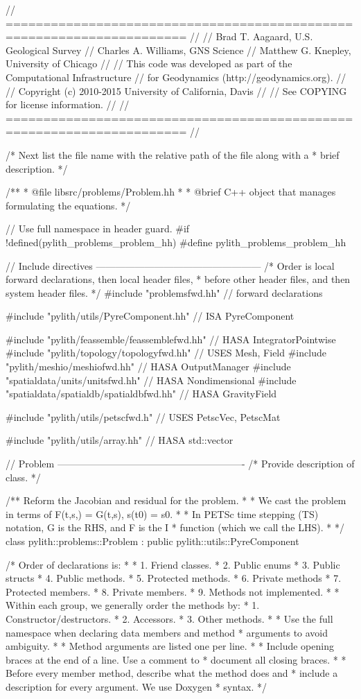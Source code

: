 \begin{cplusplus}
// ======================================================================
//
// Brad T. Aagaard, U.S. Geological Survey
// Charles A. Williams, GNS Science
// Matthew G. Knepley, University of Chicago
//
// This code was developed as part of the Computational Infrastructure
// for Geodynamics (http://geodynamics.org).
//
// Copyright (c) 2010-2015 University of California, Davis
//
// See COPYING for license information.
//
// ======================================================================
//

/* Next list the file name with the relative path of the file along with a
 * brief description.
 */  

/**
 * @file libsrc/problems/Problem.hh
 *
 * @brief C++ object that manages formulating the equations.
 */

// Use full namespace in header guard.
#if !defined(pylith_problems_problem_hh)
#define pylith_problems_problem_hh

// Include directives ---------------------------------------------------
/* Order is local forward declarations, then local header files,
 * before other header files, and then system header files.
 */
#include "problemsfwd.hh" // forward declarations

#include "pylith/utils/PyreComponent.hh" // ISA PyreComponent

#include "pylith/feassemble/feassemblefwd.hh" // HASA IntegratorPointwise
#include "pylith/topology/topologyfwd.hh" // USES Mesh, Field
#include "pylith/meshio/meshiofwd.hh" // HASA OutputManager
#include "spatialdata/units/unitsfwd.hh" // HASA Nondimensional
#include "spatialdata/spatialdb/spatialdbfwd.hh" // HASA GravityField

#include "pylith/utils/petscfwd.h" // USES PetscVec, PetscMat

#include "pylith/utils/array.hh" // HASA std::vector


// Problem ----------------------------------------------------------
/* Provide description of class.
 */
 
/** Reform the Jacobian and residual for the problem.
 *
 * We cast the problem in terms of F(t,s,) = G(t,s), s(t0) = s0.
 *
 * In PETSc time stepping (TS) notation, G is the RHS, and F is the I
 * function (which we call the LHS).
 *
 */
class pylith::problems::Problem : public pylith::utils::PyreComponent {
  /* Order of declarations is:
  *
  * 1. Friend classes.
  * 2. Public enums
  * 3. Public structs
  * 4. Public methods.
  * 5. Protected methods.
  * 6. Private methods
  * 7. Protected members.
  * 8. Private members.
  * 9. Methods not implemented.
  *
  * Within each group, we generally order the methods by:
  * 1. Constructor/destructors.
  * 2. Accessors.
  * 3. Other methods.
  *
  * Use the full namespace when declaring data members and method
  * arguments to avoid ambiguity.
  *
  * Method arguments are listed one per line.
  *
  * Include opening braces at the end of a line. Use a comment to
  * document all closing braces.
  *
  * Before every member method, describe what the method does and
  * include a description for every argument. We use Doxygen
  * syntax.
  */

}
\end{cplusplus}
